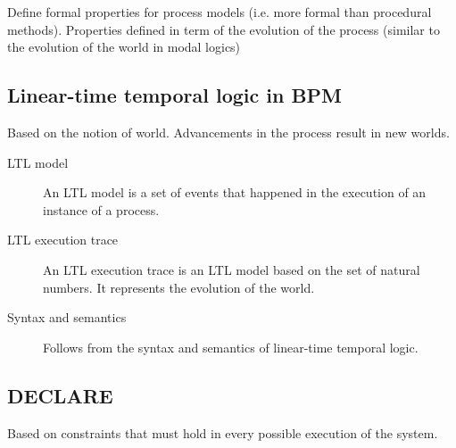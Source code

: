 Define formal properties for process models (i.e. more formal than procedural methods).
Properties defined in term of the evolution of the process (similar to the evolution of the world in modal logics)


\subsection{Linear-time temporal logic in BPM}
Based on the notion of world. Advancements in the process result in new worlds.

\begin{description}
    \item[LTL model] 
        An LTL model is a set of events that happened in the execution of an instance of a process.

    \item[LTL execution trace] 
        An LTL execution trace is an LTL model based on the set of natural numbers.
        It represents the evolution of the world.

    \item[Syntax and semantics] Follows from the syntax and semantics of linear-time temporal logic.
\end{description}


\subsection{DECLARE}

Based on constraints that must hold in every possible execution of the system.

